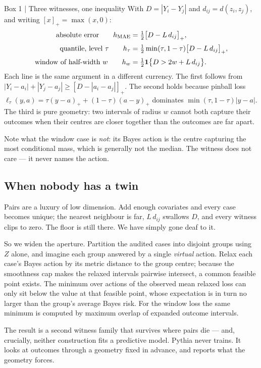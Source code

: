 \documentclass[11pt,a4paper]{article}
\begin{document}
\begin{keybox}{Box 1 \;|\; Three witnesses, one inequality}
With $D=|Y_i-Y_j|$ and $d_{ij}=d(z_i,z_j)$, and writing $[x]_+=\max(x,0)$:
\begin{align*}
\text{absolute error}\qquad h_{\rm MAE}&=\tfrac12\big[D-L\,d_{ij}\big]_+,\\[2pt]
\text{quantile, level }\tau\qquad h_{\tau}&=\tfrac12\min(\tau,1-\tau)\big[D-L\,d_{ij}\big]_+,\\[2pt]
\text{window of half-width }w\qquad h_w&=\tfrac12\mathbf 1\big\{D>2w+L\,d_{ij}\big\}.
\end{align*}
Each line is the same argument in a different currency. The first follows from $|Y_i-a_i|+|Y_j-a_j|\geq[D-|a_i-a_j|]_+$. The second holds because pinball loss $\ell_\tau(y,a)=\tau(y-a)_++(1-\tau)(a-y)_+$ dominates $\min(\tau,1-\tau)|y-a|$. The third is pure geometry: two intervals of radius $w$ cannot both capture their outcomes when their centres are closer together than the outcomes are far apart.

Note what the window case is \emph{not}: its Bayes action is the centre capturing the most conditional mass, which is generally not the median. The witness does not care --- it never names the action.
\end{keybox}

\subsection{When nobody has a twin}

Pairs are a luxury of low dimension. Add enough covariates and every case becomes unique; the nearest neighbour is far, $L\,d_{ij}$ swallows $D$, and every witness clips to zero. The floor is still there. We have simply gone deaf to it.

So we widen the aperture. Partition the audited cases into disjoint groups using $Z$ alone, and imagine each group answered by a single \emph{virtual} action. Relax each case's Bayes action by its metric distance to the group centre; because the smoothness cap makes the relaxed intervals pairwise intersect, a common feasible point exists. The minimum over actions of the observed mean relaxed loss can only sit below the value at that feasible point, whose expectation is in turn no larger than the group's average Bayes risk. For the window loss the same minimum is computed by maximum overlap of expanded outcome intervals.

The result is a second witness family that survives where pairs die --- and, crucially, neither construction fits a predictive model. Pythia never trains. It looks at outcomes through a geometry fixed in advance, and reports what the geometry forces.
\end{document}
